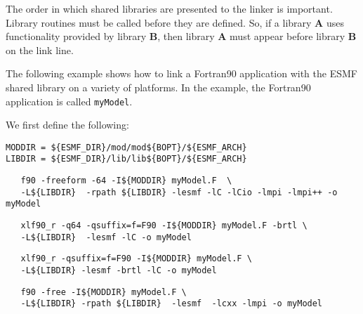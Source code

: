 The order in which shared libraries are presented to 
the linker is important. Library routines must be called before they are 
defined. So, if a library {\bf A} uses functionality provided by library 
{\bf B}, then library {\bf A} must appear before library {\bf B} on the link line. 

The following example shows how to link a Fortran90 
application with the ESMF shared library on a variety of platforms.  
In the example, the Fortran90 application is called {\tt myModel}.

\noindent We first define the following:

\begin{verbatim}
MODDIR = ${ESMF_DIR}/mod/mod${BOPT}/${ESMF_ARCH}
LIBDIR = ${ESMF_DIR}/lib/lib${BOPT}/${ESMF_ARCH}
\end{verbatim}


\begin{verbatim}
   f90 -freeform -64 -I${MODDIR} myModel.F  \
   -L${LIBDIR}  -rpath ${LIBDIR} -lesmf -lC -lCio -lmpi -lmpi++ -o myModel  
\end{verbatim}


\begin{verbatim}
   xlf90_r -q64 -qsuffix=f=F90 -I${MODDIR} myModel.F -brtl \
   -L${LIBDIR}  -lesmf -lC -o myModel
\end{verbatim}


\begin{verbatim}
   xlf90_r -qsuffix=f=F90 -I${MODDIR} myModel.F \
   -L${LIBDIR} -lesmf -brtl -lC -o myModel
\end{verbatim}


\begin{verbatim}
   f90 -free -I${MODDIR} myModel.F \
   -L${LIBDIR} -rpath ${LIBDIR}  -lesmf  -lcxx -lmpi -o myModel
\end{verbatim}









